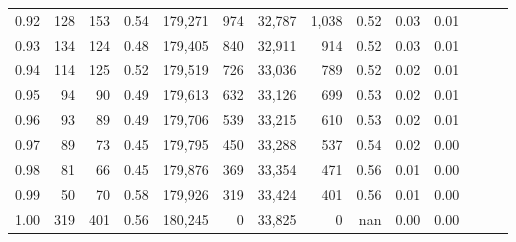 \begin{tabular}{rrrrrrrrrrrrrr}
0.92 &    128 &  153 &  0.54 &  179,271 &      974 &  32,787 &   1,038 &  0.52 &  0.03 &      0.01 \\
0.93 &    134 &  124 &  0.48 &  179,405 &      840 &  32,911 &     914 &  0.52 &  0.03 &      0.01 \\
0.94 &    114 &  125 &  0.52 &  179,519 &      726 &  33,036 &     789 &  0.52 &  0.02 &      0.01 \\
0.95 &     94 &   90 &  0.49 &  179,613 &      632 &  33,126 &     699 &  0.53 &  0.02 &      0.01 \\
0.96 &     93 &   89 &  0.49 &  179,706 &      539 &  33,215 &     610 &  0.53 &  0.02 &      0.01 \\
0.97 &     89 &   73 &  0.45 &  179,795 &      450 &  33,288 &     537 &  0.54 &  0.02 &      0.00 \\
0.98 &     81 &   66 &  0.45 &  179,876 &      369 &  33,354 &     471 &  0.56 &  0.01 &      0.00 \\
0.99 &     50 &   70 &  0.58 &  179,926 &      319 &  33,424 &     401 &  0.56 &  0.01 &      0.00 \\
1.00 &    319 &  401 &  0.56 &  180,245 &        0 &  33,825 &       0 &   nan &  0.00 &      0.00 \\
\bottomrule
\end{tabular}
